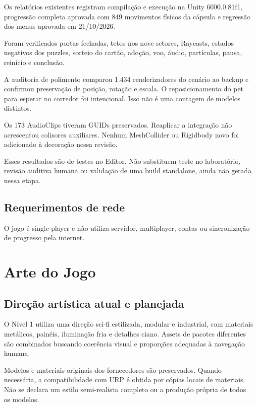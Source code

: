 \documentclass[12pt,a4paper]{article}
\begin{document}
Os relatórios existentes registram compilação e execução na Unity
6000.0.81f1, progressão completa aprovada com 849 movimentos físicos
da cápsula e regressão dos menus aprovada em 21/10/2026.

Foram verificados portas fechadas, tetos nos nove setores,
Raycasts, estados negativos dos puzzles, sorteio do cartão,
adoção, voo, áudio, partículas, pausa, reinício e conclusão.

A auditoria de polimento comparou 1.434 renderizadores do cenário
ao backup e confirmou preservação de posição, rotação e escala.
O reposicionamento do pet para esperar no corredor foi intencional.
Isso não é uma contagem de modelos distintos.

Os 173 AudioClips tiveram GUIDs preservados. Reaplicar a integração
não acrescentou colisores auxiliares. Nenhum MeshCollider ou
Rigidbody novo foi adicionado à decoração nessa revisão.

Esses resultados são de testes no Editor. Não substituem teste no
laboratório, revisão auditiva humana ou validação de uma build
standalone, ainda não gerada nessa etapa.

\subsection{Requerimentos de rede}

O jogo é single-player e não utiliza servidor, multiplayer,
contas ou sincronização de progresso pela internet.



\section{Arte do Jogo}

\subsection*{Direção artística atual e planejada}

O Nível 1 utiliza uma direção sci-fi estilizada, modular e industrial,
com materiais metálicos, painéis, iluminação fria e detalhes ciano.
Assets de pacotes diferentes são combinados buscando coerência
visual e proporções adequadas à navegação humana.

Modelos e materiais originais dos fornecedores são preservados.
Quando necessária, a compatibilidade com URP é obtida por cópias
locais de materiais. Não se declara um estilo semi-realista completo
ou a produção própria de todos os modelos.
\end{document}
